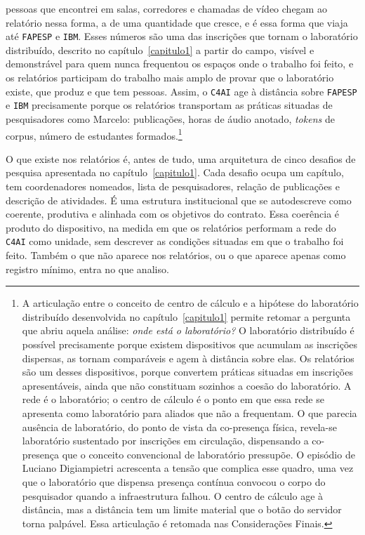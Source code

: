 pessoas que encontrei em salas, corredores e chamadas de vídeo chegam ao relatório nessa forma, a de uma quantidade que cresce, e é essa forma que viaja até \texttt{FAPESP} e \texttt{IBM}. Esses números são uma das inscrições que tornam o laboratório distribuído, descrito no capítulo~\ref{capitulo1} a partir do campo, visível e demonstrável para quem nunca frequentou os espaços onde o trabalho foi feito, e os relatórios participam do trabalho mais amplo de provar que o laboratório existe, que produz e que tem pessoas. Assim, o \texttt{C4AI} age à distância sobre \texttt{FAPESP} e \texttt{IBM} precisamente porque os relatórios transportam as práticas situadas de pesquisadores como Marcelo: publicações, horas de áudio anotado, \textit{tokens} de corpus, número de estudantes formados.\footnote{A articulação entre o conceito de centro de cálculo \parencite{Latour2011CienciaEmAcao} e a hipótese do laboratório distribuído desenvolvida no capítulo~\ref{capitulo1} permite retomar a pergunta que abriu aquela análise: \textit{onde está o laboratório?} O laboratório distribuído é possível precisamente porque existem dispositivos que acumulam as inscrições dispersas, as tornam comparáveis e agem à distância sobre elas. Os relatórios são um desses dispositivos, porque convertem práticas situadas em inscrições apresentáveis, ainda que não constituam sozinhos a coesão do laboratório. A rede é o laboratório; o centro de cálculo é o ponto em que essa rede se apresenta como laboratório para aliados que não a frequentam. O que parecia ausência de laboratório, do ponto de vista da co-presença física, revela-se laboratório sustentado por inscrições em circulação, dispensando a co-presença que o conceito convencional de laboratório pressupõe. O episódio de Luciano Digiampietri \parencite{DigiampietriInstagram2026} acrescenta a tensão que complica esse quadro, uma vez que o laboratório que dispensa presença contínua convocou o corpo do pesquisador quando a infraestrutura falhou. O centro de cálculo age à distância, mas a distância tem um limite material que o botão do servidor torna palpável. Essa articulação é retomada nas Considerações Finais.}

O que existe nos relatórios é, antes de tudo, uma arquitetura de cinco desafios de pesquisa apresentada no capítulo~\ref{capitulo1}. Cada desafio ocupa um capítulo, tem coordenadores nomeados, lista de pesquisadores, relação de publicações e descrição de atividades. É uma estrutura institucional que se autodescreve como coerente, produtiva e alinhada com os objetivos do contrato. Essa coerência é produto do dispositivo, na medida em que os relatórios performam a rede do \texttt{C4AI} como unidade, sem descrever as condições situadas em que o trabalho foi feito. Também o que não aparece nos relatórios, ou o que aparece apenas como registro mínimo, entra no que analiso.

